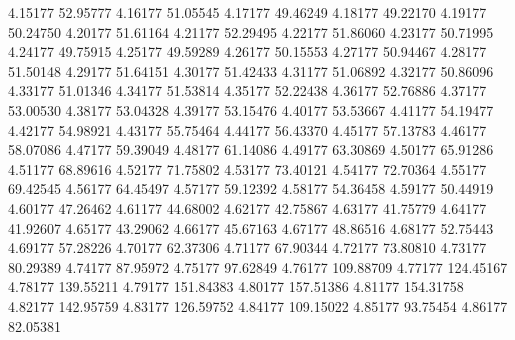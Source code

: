      4.15177     52.95777    
      4.16177     51.05545    
      4.17177     49.46249    
      4.18177     49.22170    
      4.19177     50.24750    
      4.20177     51.61164    
      4.21177     52.29495    
      4.22177     51.86060    
      4.23177     50.71995    
      4.24177     49.75915    
      4.25177     49.59289    
      4.26177     50.15553    
      4.27177     50.94467    
      4.28177     51.50148    
      4.29177     51.64151    
      4.30177     51.42433    
      4.31177     51.06892    
      4.32177     50.86096    
      4.33177     51.01346    
      4.34177     51.53814    
      4.35177     52.22438    
      4.36177     52.76886    
      4.37177     53.00530    
      4.38177     53.04328    
      4.39177     53.15476    
      4.40177     53.53667    
      4.41177     54.19477    
      4.42177     54.98921    
      4.43177     55.75464    
      4.44177     56.43370    
      4.45177     57.13783    
      4.46177     58.07086    
      4.47177     59.39049    
      4.48177     61.14086    
      4.49177     63.30869    
      4.50177     65.91286    
      4.51177     68.89616    
      4.52177     71.75802    
      4.53177     73.40121    
      4.54177     72.70364    
      4.55177     69.42545    
      4.56177     64.45497    
      4.57177     59.12392    
      4.58177     54.36458    
      4.59177     50.44919    
      4.60177     47.26462    
      4.61177     44.68002    
      4.62177     42.75867    
      4.63177     41.75779    
      4.64177     41.92607    
      4.65177     43.29062    
      4.66177     45.67163    
      4.67177     48.86516    
      4.68177     52.75443    
      4.69177     57.28226    
      4.70177     62.37306    
      4.71177     67.90344    
      4.72177     73.80810    
      4.73177     80.29389    
      4.74177     87.95972    
      4.75177     97.62849    
      4.76177    109.88709    
      4.77177    124.45167    
      4.78177    139.55211    
      4.79177    151.84383    
      4.80177    157.51386    
      4.81177    154.31758    
      4.82177    142.95759    
      4.83177    126.59752    
      4.84177    109.15022    
      4.85177     93.75454    
      4.86177     82.05381    

